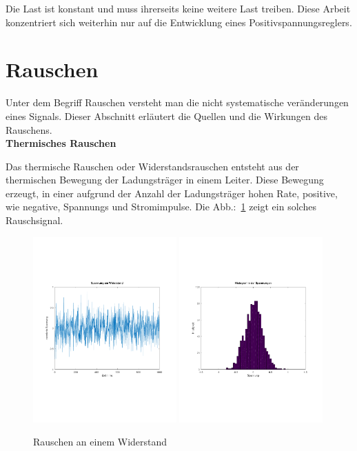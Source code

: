Die Last ist konstant und muss ihrerseits keine weitere Last treiben.
Diese Arbeit konzentriert sich weiterhin nur auf die Entwicklung eines 
Positivspannungsreglers.

\section{Rauschen}
Unter dem Begriff Rauschen versteht man die nicht systematische veränderungen
eines Signals.
Dieser Abschnitt erläutert die Quellen und die Wirkungen des Rauschens.\\

\textbf{Thermisches Rauschen}

Das thermische Rauschen oder Widerstandsrauschen entsteht aus der thermischen 
Bewegung der Ladungsträger in einem Leiter.
Diese Bewegung erzeugt, in einer aufgrund der Anzahl der Ladungsträger
hohen Rate, positive, wie negative, Spannungs und Stromimpulse. 
Die Abb.:~\ref{FIG:NOISE} zeigt ein solches Rauschsignal.
\begin{figure}
  \centering
  \includegraphics[clip, width=0.49\textwidth]
  {./../common/Simulation/rauschen/spannung.pdf}
  \includegraphics[clip, width=0.49\textwidth]
  {./../common/Simulation/rauschen/haeufigkeit.pdf}
  \caption{Rauschen an einem Widerstand}\label{FIG:NOISE}
\end{figure}
